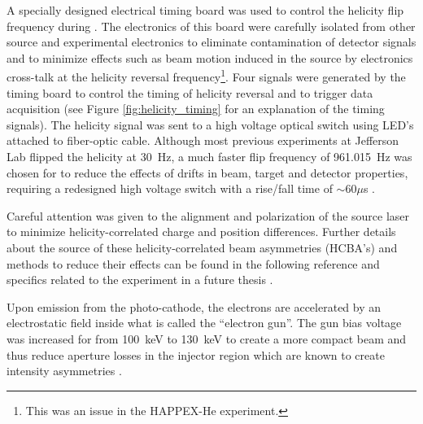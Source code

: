 A specially designed electrical timing board was used to control the helicity flip frequency during \Q. The electronics of this board were carefully isolated from other source and experimental electronics to eliminate contamination of detector signals and to minimize effects such as beam motion induced in the source by electronics cross-talk at the helicity reversal frequency\footnote{This was an issue in the HAPPEX-He experiment\cite{Paschke2007}.}. Four signals were generated by the timing board to control the timing of helicity reversal and to trigger data acquisition (see Figure \ref{fig:helicity_timing} for an explanation of the timing signals). The helicity signal was sent to a high voltage optical switch using LED's attached to fiber-optic cable. Although most previous experiments at Jefferson Lab flipped the helicity at 30~Hz, a much faster flip frequency of 961.015~Hz was chosen for \Qs to reduce the effects of drifts in beam, target and detector properties, requiring a redesigned high voltage switch with a rise/fall time of $\sim60 \mu$s \cite{Adderley2012}. 

Careful attention was given to the alignment and polarization of the source laser to minimize helicity-correlated charge and position differences. Further details about the source of these helicity-correlated beam asymmetries (HCBA's) and methods to reduce their effects can be found in the following reference \cite{Paschke2007} and specifics related to the \Qs experiment in a future thesis \cite{Kargiantoulakis}.

Upon emission from the photo-cathode, the electrons are accelerated by an electrostatic field inside what is called the ``electron gun''. The gun bias voltage was increased for \Qs from 100~keV to 130~keV to create a more compact beam and thus reduce aperture losses in the injector region which are known to create intensity asymmetries \cite{Adderley2012}.

